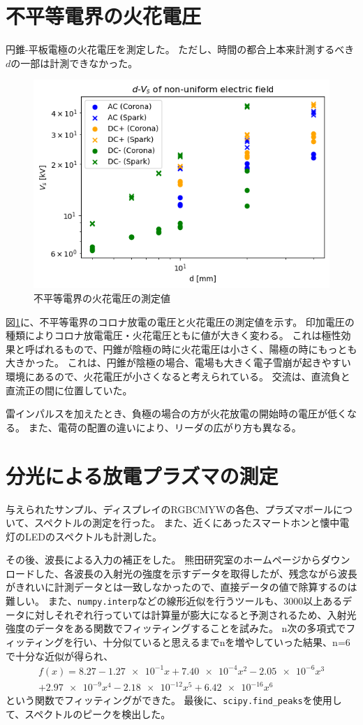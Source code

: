\documentclass[a4paper]{ltjsarticle}
\begin{document}
\section{不平等電界の火花電圧}
円錐-平板電極の火花電圧を測定した。
ただし、時間の都合上本来計測するべき$d$の一部は計測できなかった。
\begin{figure}
    \centering
    \includegraphics[width=0.7\linewidth]{./images/unequal.png}
    \caption{不平等電界の火花電圧の測定値}
    \label{fig:unequal}
\end{figure}
図\ref{fig:unequal}に、不平等電界のコロナ放電の電圧と火花電圧の測定値を示す。
印加電圧の種類によりコロナ放電電圧・火花電圧ともに値が大きく変わる。
これは極性効果と呼ばれるもので、円錐が陰極の時に火花電圧は小さく、陽極の時にもっとも大きかった。
これは、円錐が陰極の場合、電場も大きく電子雪崩が起きやすい環境にあるので、火花電圧が小さくなると考えられている\cite{Journal 2}。
交流は、直流負と直流正の間に位置していた。

雷インパルスを加えたとき、負極の場合の方が火花放電の開始時の電圧が低くなる。
また、電荷の配置の違いにより、リーダの広がり方も異なる\cite{Journal 3}。

\section{分光による放電プラズマの測定}
与えられたサンプル、ディスプレイのRGBCMYWの各色、プラズマボールについて、スペクトルの測定を行った。
また、近くにあったスマートホンと懐中電灯のLEDのスペクトルも計測した。

その後、波長による入力の補正をした。
熊田研究室のホームページからダウンロードした、各波長の入射光の強度を示すデータを取得したが、残念ながら波長がきれいに計測データとは一致しなかったので、直接データの値で除算するのは難しい。
また、\verb|numpy.interp|などの線形近似を行うツールも、3000以上あるデータに対しそれぞれ行っていては計算量が膨大になると予測されるため、入射光強度のデータをある関数でフィッティングすることを試みた。
n次の多項式でフィッティングを行い、十分似ていると思えるまでnを増やしていった結果、n=6で十分な近似が得られ、
\begin{multline}
    f(x) = 8.27 - \num{1.27e-1}x + \num{7.40e-4}x^2 - \num{2.05e-6}x^3\\ + \num{2.97e-9}x^4 - \num{2.18e-12}x^5 + \num{6.42e-16}x^6
\end{multline}
という関数でフィッティングができた。
最後に、\verb|scipy.find_peaks|を使用して、スペクトルのピークを検出した。
\end{document}
